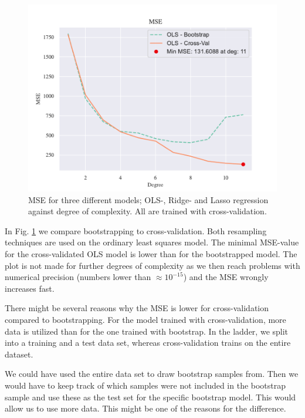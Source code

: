 \begin{figure}[h!]
    \centering
    \includegraphics[width=1\linewidth]{project_1/figures/figures_in_report/CV_BS_OLS_Terrain.pdf}
    \caption{MSE for three different models; OLS-, Ridge- and Lasso regression against degree of complexity. All are trained with cross-validation.}
    \label{cv_versus_bs}
\end{figure}

In Fig. \ref{cv_versus_bs} we compare bootstrapping to cross-validation. Both resampling techniques are used on the ordinary least squares model. The minimal MSE-value for the cross-validated OLS model is lower than for the bootstrapped model. The plot is not made for further degrees of complexity as we then reach problems with numerical precision (numbers lower than $\approx 10^{-15}$) and the MSE wrongly increases fast.  

There might be several reasons why the MSE is lower for cross-validation compared to bootstrapping. For the model trained with cross-validation, more data is utilized than for the one trained with bootstrap. In the ladder, we split into a training and a test data set, whereas cross-validation trains on the entire dataset.

We could have used the entire data set to draw bootstrap samples from. Then we would have to keep track of which samples were not included in the bootstrap sample and use these as the test set for the specific bootstrap model. This would allow us to use more data. This might be one of the reasons for the difference. 


